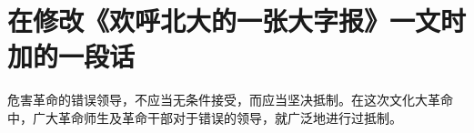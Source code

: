 \section[在修改《欢呼北大的一张大字报》一文时加的一段话（一九六六年八月五日）]{在修改《欢呼北大的一张大字报》一文时加的一段话}


危害革命的错误领导，不应当无条件接受，而应当坚决抵制。在这次文化大革命中，广大革命师生及革命干部对于错误的领导，就广泛地进行过抵制。


